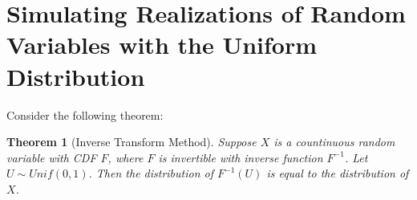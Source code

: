 \documentclass[12pt]{article}
\newtheorem*{theorem}{Theorem}
\begin{document}
\section{Simulating Realizations of Random Variables with the Uniform
  Distribution}

Consider the following theorem:

\begin{theorem}
	[Inverse Transform Method] Suppose $X$ is a countinuous random
	variable with CDF $F$, where $F$ is invertible with inverse function
	$F^{-1}$. Let $U \sim Unif(0, 1)$. Then the distribution of $F^{-1}(U)$
	is equal to the distribution of $X$.
\end{theorem}
\end{document}
